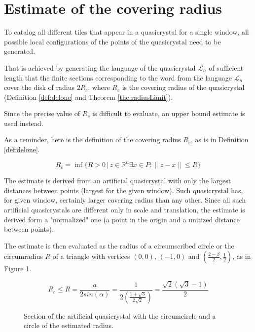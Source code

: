 \documentclass[text.tex]{subfiles}
\begin{document}
\section{Estimate of the covering radius}
To catalog all different tiles that appear in a quasicrystal for a single window, all possible local configurations of the points of the quasicrystal need to be generated. 

That is achieved by generating the language of the quasicrystal $\mathcal{L}_n$ of sufficient length that the finite sections corresponding to the word from the language $\mathcal{L}_n$ cover the disk of radius $2R_c$, where $R_c$ is the covering radius of the quasicrystal (Definition \ref{def:delone} and Theorem \ref{the:radiusLimit}).

Since the precise value of $R_c$ is difficult to evaluate, an upper bound estimate is used instead. 

As a reminder, here is the definition of the covering radius $R_c$, as is in Definition \ref{def:delone}.

$$R_c = \inf\{R>0\,|\, z\in\mathbb{R}^n \exists x\in P: \|z-x\|\leq R\}$$

The estimate is derived from an artificial quasicrystal with only the largest distances between points (largest for the given window). Such quasicrystal has, for given window, certainly larger covering radius than any other. Since all such artificial quasicrystals are different only in scale and translation, the estimate is derived form a "normalized" one (a point in the origin and a unitized distance between points).

The estimate is then evaluated as the radius of a circumscribed circle or the circumradius $R$ of a triangle with vertices $(0,0)$, $(-1,0)$ and $\left(\frac{2-\beta}{2},\frac{1}{2}\right)$, as in Figure \ref{fig:coveringRadius}. 

$$R_c \leq R = \frac{a}{2sin(\alpha)} = \frac{1}{2\left(\frac{1+\sqrt{3}}{2\sqrt{2}}\right)} = \frac{\sqrt{2}(\sqrt{3}-1)}{2}$$

\begin{figure}[h]
\centering
{}
\caption{Section of the artificial quasicrystal with the circumcircle and a circle of the estimated radius.}
\label{fig:coveringRadius}
\end{figure}
\end{document}
